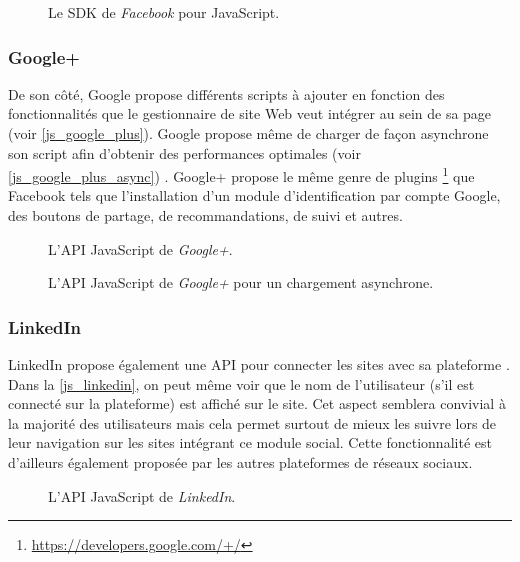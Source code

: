 \begin{figure}[h]
	\centering
	
	\caption{\label{js_facebook_sdk}Le SDK de \textit{Facebook} pour JavaScript.}
\end{figure}

\subsubsection{Google+}
De son côté, Google propose différents scripts à ajouter en fonction des fonctionnalités que le gestionnaire de site Web veut intégrer au sein de sa page (voir \autoref{js_google_plus}). Google propose même de charger de façon asynchrone son script afin d'obtenir des performances optimales (voir \autoref{js_google_plus_async}) \cite{javascript_google_plus}. Google+ propose le même genre de plugins \footnote{\url{https://developers.google.com/+/}} que Facebook tels que l'installation d'un module d'identification par compte Google, des boutons de partage, de recommandations, de suivi et autres.

\begin{figure}[h]
	\centering
	
	\caption{\label{js_google_plus}L'API JavaScript de \textit{Google+}.}
\end{figure}

\begin{figure}[h]
	\centering
	
	\caption{\label{js_google_plus_async}L'API JavaScript de \textit{Google+} pour un chargement asynchrone.}
\end{figure}

\subsubsection{LinkedIn}
LinkedIn propose également une API pour connecter les sites avec sa plateforme \cite{javascript_linkedin}. Dans la \autoref{js_linkedin}, on peut même voir que le nom de l'utilisateur (s'il est connecté sur la plateforme) est affiché sur le site. Cet aspect semblera convivial à la majorité des utilisateurs mais cela permet surtout de mieux les suivre lors de leur navigation sur les sites intégrant ce module social. Cette fonctionnalité est d'ailleurs également proposée par les autres plateformes de réseaux sociaux.

\begin{figure}[!h]
	\centering
	
	\caption{\label{js_linkedin}L'API JavaScript de \textit{LinkedIn}.}
\end{figure}


